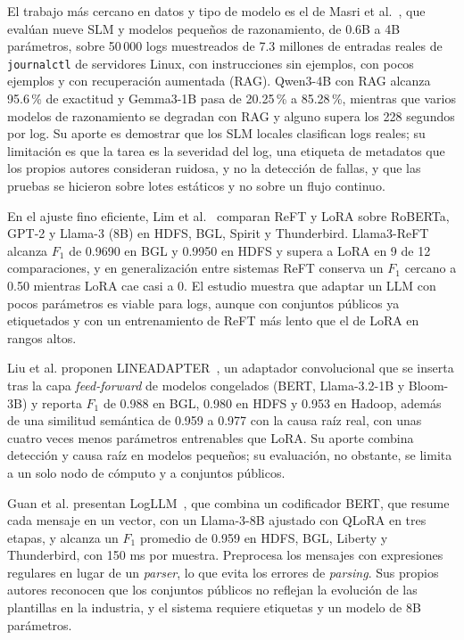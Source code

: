 El trabajo más cercano en datos y tipo de modelo es el de Masri et al.~\cite{masri2026_slm_severity}, que evalúan nueve SLM y modelos pequeños de razonamiento, de 0.6B a 4B parámetros, sobre 50\,000 logs muestreados de 7.3 millones de entradas reales de \texttt{journalctl} de servidores Linux, con instrucciones sin ejemplos, con pocos ejemplos y con recuperación aumentada (RAG). Qwen3-4B con RAG alcanza 95.6\,\% de exactitud y Gemma3-1B pasa de 20.25\,\% a 85.28\,\%, mientras que varios modelos de razonamiento se degradan con RAG y alguno supera los 228 segundos por log. Su aporte es demostrar que los SLM locales clasifican logs reales; su limitación es que la tarea es la severidad del log, una etiqueta de metadatos que los propios autores consideran ruidosa, y no la detección de fallas, y que las pruebas se hicieron sobre lotes estáticos y no sobre un flujo continuo.

En el ajuste fino eficiente, Lim et al.~\cite{lim2025_logadreft} comparan ReFT y LoRA sobre RoBERTa, GPT-2 y Llama-3 (8B) en HDFS, BGL, Spirit y Thunderbird. Llama3-ReFT alcanza $F_1$ de 0.9690 en BGL y 0.9950 en HDFS y supera a LoRA en 9 de 12 comparaciones, y en generalización entre sistemas ReFT conserva un $F_1$ cercano a 0.50 mientras LoRA cae casi a 0. El estudio muestra que adaptar un LLM con pocos parámetros es viable para logs, aunque con conjuntos públicos ya etiquetados y con un entrenamiento de ReFT más lento que el de LoRA en rangos altos.

Liu et al. proponen LINEADAPTER~\cite{liu2025_lineadapter}, un adaptador convolucional que se inserta tras la capa \textit{feed-forward} de modelos congelados (BERT, Llama-3.2-1B y Bloom-3B) y reporta $F_1$ de 0.988 en BGL, 0.980 en HDFS y 0.953 en Hadoop, además de una similitud semántica de 0.959 a 0.977 con la causa raíz real, con unas cuatro veces menos parámetros entrenables que LoRA. Su aporte combina detección y causa raíz en modelos pequeños; su evaluación, no obstante, se limita a un solo nodo de cómputo y a conjuntos públicos.

Guan et al. presentan LogLLM~\cite{guan2024_logllm}, que combina un codificador BERT, que resume cada mensaje en un vector, con un Llama-3-8B ajustado con QLoRA en tres etapas, y alcanza un $F_1$ promedio de 0.959 en HDFS, BGL, Liberty y Thunderbird, con 150 ms por muestra. Preprocesa los mensajes con expresiones regulares en lugar de un \textit{parser}, lo que evita los errores de \textit{parsing}. Sus propios autores reconocen que los conjuntos públicos no reflejan la evolución de las plantillas en la industria, y el sistema requiere etiquetas y un modelo de 8B parámetros.

